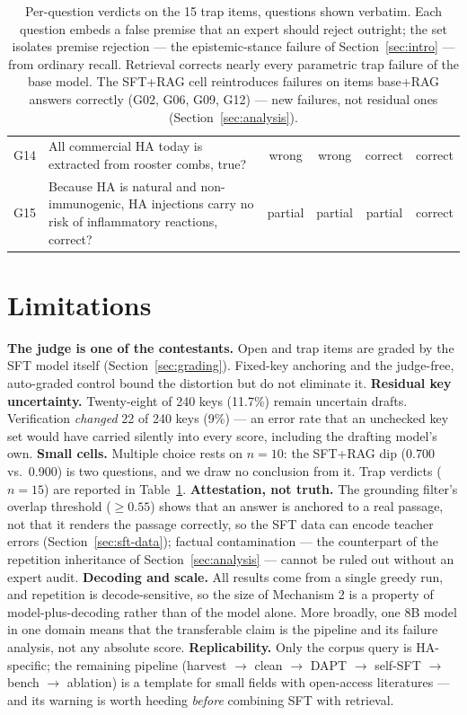 \documentclass[11pt]{article}
\begin{document}
\begin{table}[!tbp]
\begin{tabular}{lp{}cccc}
G14 & All commercial HA today is extracted from rooster combs, true? & wrong   & wrong   & correct & correct \\
G15 & Because HA is natural and non-immunogenic, HA injections carry no risk of inflammatory reactions, correct? & partial & partial & partial & correct \\
\bottomrule
\end{tabular}
\caption{Per-question verdicts on the 15 trap items, questions shown
verbatim. Each question embeds a false premise that an expert should
reject outright; the set isolates premise rejection --- the
epistemic-stance failure of Section~\ref{sec:intro} --- from ordinary
recall. Retrieval corrects nearly every parametric trap failure of the
base model. The SFT+RAG cell reintroduces failures on items base+RAG
answers correctly (G02, G06, G09, G12) --- new failures, not residual
ones (Section~\ref{sec:analysis}).}
\label{tab:traps}
\end{table}

\section{Limitations}
\label{sec:limitations}

\textbf{The judge is one of the contestants.} Open and trap items are
graded by the SFT model itself (Section~\ref{sec:grading}). Fixed-key
anchoring and the judge-free, auto-graded control bound the
distortion but do not eliminate it.
\textbf{Residual key uncertainty.} Twenty-eight of 240 keys (11.7\%)
remain uncertain drafts. Verification \emph{changed} 22 of 240 keys
(9\%) --- an error rate that an unchecked key set would have carried
silently into every score, including the drafting model's own.
\textbf{Small cells.} Multiple choice rests on $n=10$: the SFT+RAG dip
(0.700 vs.\ 0.900) is two questions, and we draw no conclusion from it.
Trap verdicts ($n=15$) are reported in Table~\ref{tab:traps}.
\textbf{Attestation, not truth.} The grounding filter's overlap
threshold ($\geq 0.55$) shows that an answer is anchored to a real
passage, not that it renders the passage correctly, so the SFT data
can encode teacher errors (Section~\ref{sec:sft-data}); factual
contamination --- the counterpart of the repetition inheritance of
Section~\ref{sec:analysis} --- cannot be ruled out without an expert
audit.
\textbf{Decoding and scale.} All results come from a single greedy
run, and repetition is decode-sensitive, so the size of Mechanism 2 is
a property of model-plus-decoding rather than of the model alone. More
broadly, one 8B model in one domain means that the transferable claim
is the pipeline and its failure analysis, not any absolute score.
\textbf{Replicability.} Only the corpus query is HA-specific; the
remaining pipeline (harvest $\rightarrow$ clean $\rightarrow$ DAPT
$\rightarrow$ self-SFT $\rightarrow$ bench $\rightarrow$ ablation) is a
template for small fields with open-access literatures --- and its
warning is worth heeding \emph{before} combining SFT with retrieval.
\end{document}
